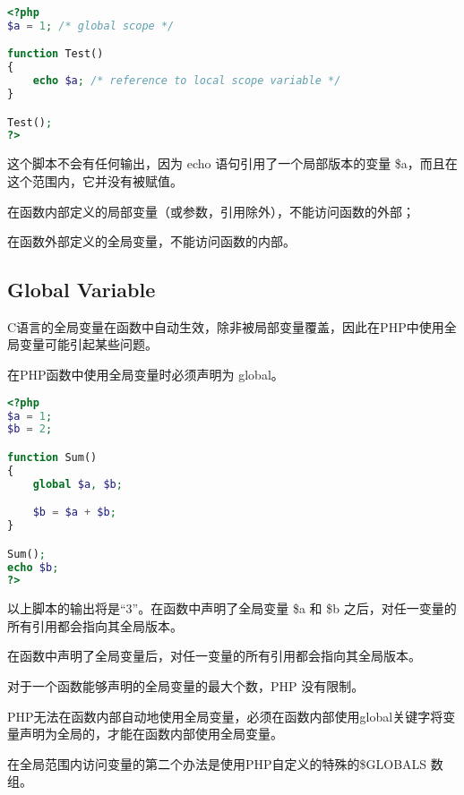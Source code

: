 \begin{lstlisting}[language=PHP]
<?php
$a = 1; /* global scope */

function Test()
{
    echo $a; /* reference to local scope variable */
}

Test();
?>
\end{lstlisting}

这个脚本不会有任何输出，因为 echo 语句引用了一个局部版本的变量 \$a，而且在这个范围内，它并没有被赋值。

\begin{compactitem}
\item 在函数内部定义的局部变量（或参数，引用除外），不能访问函数的外部；
\item 在函数外部定义的全局变量，不能访问函数的内部。
\end{compactitem}






\subsection{Global Variable}


C语言的全局变量在函数中自动生效，除非被局部变量覆盖，因此在PHP中使用全局变量可能引起某些问题。

在PHP函数中使用全局变量时必须声明为 global。

\begin{lstlisting}[language=PHP]
<?php
$a = 1;
$b = 2;

function Sum()
{
    global $a, $b;

    $b = $a + $b;
}

Sum();
echo $b;
?>
\end{lstlisting}

以上脚本的输出将是“3”。在函数中声明了全局变量 \$a 和 \$b 之后，对任一变量的所有引用都会指向其全局版本。

\begin{compactitem}
\item 在函数中声明了全局变量后，对任一变量的所有引用都会指向其全局版本。
\item 对于一个函数能够声明的全局变量的最大个数，PHP 没有限制。
\end{compactitem}



PHP无法在函数内部自动地使用全局变量，必须在函数内部使用global关键字将变量声明为全局的，才能在函数内部使用全局变量。

在全局范围内访问变量的第二个办法是使用PHP自定义的特殊的\$GLOBALS 数组。


